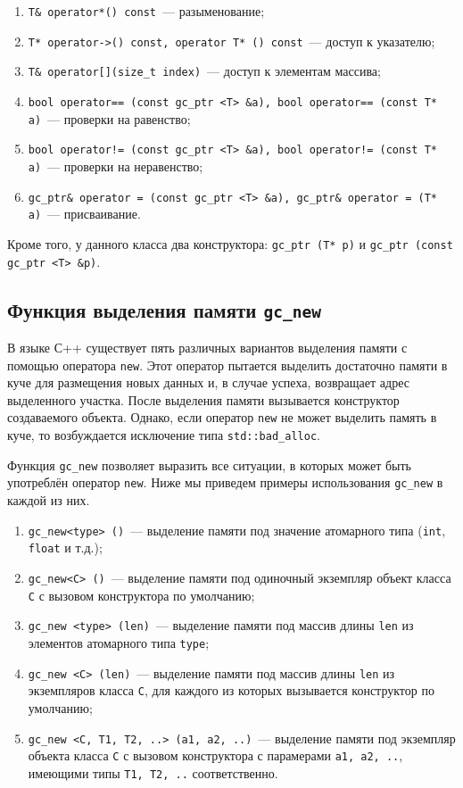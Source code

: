 \begin{enumerate}
\item \lstinline{T& operator*() const}~--- разыменование;
\item \lstinline{T* operator->() const, operator T* () const}~--- доступ к указателю;
\item \lstinline{T& operator[](size_t index)}~--- доступ к элементам массива;
\item \lstinline{bool operator== (const gc_ptr <T> &a), bool operator== (const T* a)}~--- проверки на равенство;
\item \lstinline{bool operator!= (const gc_ptr <T> &a), bool operator!= (const T* a)}~--- проверки на неравенство;
\item \lstinline{gc_ptr& operator = (const gc_ptr <T> &a), gc_ptr& operator = (T* a)}~--- присваивание.
\end{enumerate}

Кроме того, у данного класса два конструктора: \lstinline{gc_ptr (T* p)} и \lstinline{gc_ptr (const gc_ptr <T> &p)}. 

\subsection{Функция выделения памяти \lstinline{gc_new}}

В языке С++ существует пять различных вариантов выделения памяти с помощью оператора \lstinline{new}. 
Этот оператор пытается выделить достаточно памяти в куче для размещения новых данных и, в случае успеха, возвращает 
адрес выделенного участка. После выделения памяти вызывается конструктор создаваемого объекта. Однако, если оператор
\lstinline{new} не может выделить память в куче, то возбуждается исключение типа \lstinline{std::bad_alloc}. 

Функция \lstinline{gc_new} позволяет выразить все ситуации, в которых может быть употреблён оператор \lstinline{new}.
Ниже мы приведем примеры использования \lstinline{gc_new} в каждой из них.

\begin {enumerate}
\item \lstinline{gc_new<type> ()}~--- выделение памяти под значение атомарного типа (\lstinline{int}, \lstinline{float} и т.д.); 
\item \lstinline{gc_new<C> ()}~--- выделение памяти под одиночный экземпляр объект класса \lstinline{C} с вызовом конструктора по
умолчанию;
\item \lstinline{gc_new <type> (len)}~--- выделение памяти под массив длины \lstinline{len} из элементов атомарного типа \lstinline{type};
\item \lstinline{gc_new <C> (len)}~--- выделение памяти под массив длины \lstinline{len} из экземпляров класса \lstinline{C}, для каждого из
которых вызывается конструктор по умолчанию;
\item \lstinline{gc_new <C, T1, T2, ..> (a1, a2, ..)}~--- выделение памяти под экземпляр объекта класса \lstinline{C} с вызовом
конструктора с парамерами \lstinline{a1, a2, ..}, имеющими типы \lstinline{T1, T2, ..} соответственно.
\end {enumerate}

